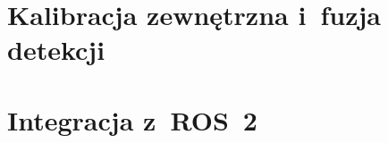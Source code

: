 \section{Kalibracja zewnętrzna i~fuzja detekcji}
\label{sec:kalibracja-zewn-fuzja}


\section{Integracja z~ROS~2}
\label{sec:ros2}

